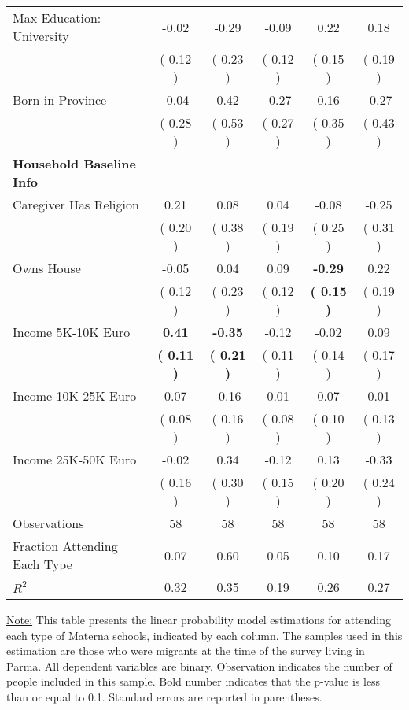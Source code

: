 \begin{table}[H]
{\begin{tabular}{lccccc}
\quad Max Education: University &     -0.02 &     -0.29 &     -0.09 &      0.22 &      0.18 \\
\quad  & (     0.12 ) & (     0.23 )  & (     0.12 )  & (     0.15 ) & (     0.19 ) \\
\quad Born in Province &     -0.04 &      0.42 &     -0.27 &      0.16 &     -0.27 \\
\quad  & (     0.28 ) & (     0.53 )  & (     0.27 )  & (     0.35 ) & (     0.43 ) \\
\midrule
\textbf{Household Baseline Info} \\
\quad Caregiver Has Religion &      0.21 &      0.08 &      0.04 &     -0.08 &     -0.25 \\
\quad  & (     0.20 ) & (     0.38 )  & (     0.19 )  & (     0.25 ) & (     0.31 ) \\
\quad Owns House &     -0.05 &      0.04 &      0.09 & \textbf{    -0.29} &      0.22 \\
\quad  & (     0.12 ) & (     0.23 )  & (     0.12 )  & \textbf{(     0.15 )} & (     0.19 ) \\
\quad Income 5K-10K Euro & \textbf{     0.41} & \textbf{    -0.35} &     -0.12 &     -0.02 &      0.09 \\
\quad  & \textbf{(     0.11 )} & \textbf{(     0.21 )}  & (     0.11 )  & (     0.14 ) & (     0.17 ) \\
\quad Income 10K-25K Euro &      0.07 &     -0.16 &      0.01 &      0.07 &      0.01 \\
\quad  & (     0.08 ) & (     0.16 )  & (     0.08 )  & (     0.10 ) & (     0.13 ) \\
\quad Income 25K-50K Euro &     -0.02 &      0.34 &     -0.12 &      0.13 &     -0.33 \\
\quad  & (     0.16 ) & (     0.30 )  & (     0.15 )  & (     0.20 ) & (     0.24 ) \\
\midrule
Observations & 58 & 58 & 58 & 58 & 58 \\
Fraction Attending Each Type &      0.07 &      0.60 &      0.05 &      0.10 &      0.17 \\
\midrule
$ R^2$ &      0.32 &      0.35 &      0.19 &      0.26 &      0.27 \\
\bottomrule
\end{tabular}}
\end{table}
\begin{scriptsize}
\noindent\underline{Note:} This table presents the linear probability model estimations for attending each type of Materna schools, indicated by each column. The samples used in this estimation are those who were migrants at the time of the survey living in Parma. All dependent variables are binary. Observation indicates the number of people included in this sample. Bold number indicates that the p-value is less than or equal to 0.1. Standard errors are reported in parentheses.
\end{scriptsize}
